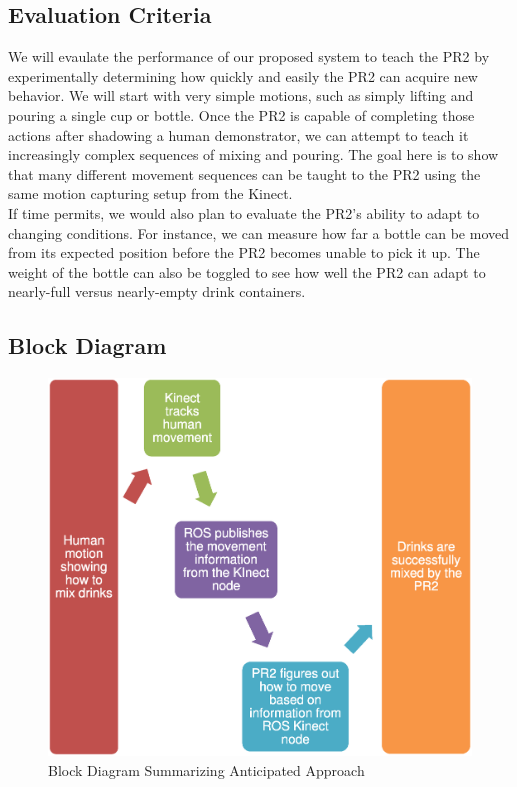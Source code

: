 \documentclass{sig-alternate}
\begin{document}
\subsection{Evaluation Criteria}
\label{subsec:eval_criteria}
We will evaulate the performance of our proposed system to teach the PR2 by experimentally determining how quickly and easily the PR2
can acquire new behavior. We will start with very simple motions, such as simply lifting and pouring a single cup or bottle. Once the PR2 is capable of completing those actions after shadowing a human demonstrator, we can attempt to teach it increasingly complex sequences of mixing and pouring. The goal here is to show that many different movement sequences can be taught to the PR2 using the same motion capturing setup from the Kinect.\\
If time permits, we would also plan to evaluate the PR2's ability to adapt to changing conditions. For instance, we can measure how far a bottle can be moved from its expected position before the PR2 becomes unable to pick it up. The weight of the bottle can also be toggled to see how well the PR2 can adapt to nearly-full versus nearly-empty drink containers.

\subsection{Block Diagram}
\label{subsec:block_diagram}

\begin{figure}[h!] 
	\begin{center}
		\includegraphics[width=0.9\linewidth]{flowchart}
	\end{center}
	\caption{Block Diagram Summarizing Anticipated Approach}
	\label{fig:some_graph}
\end{figure}
\end{document}

